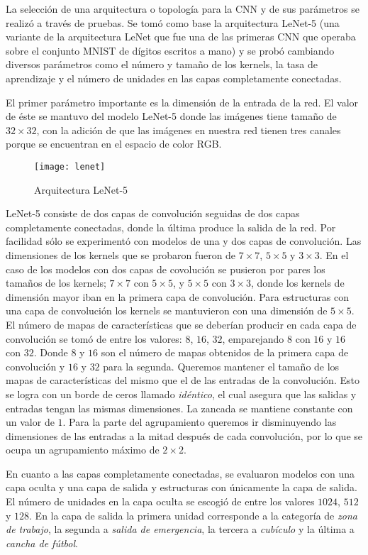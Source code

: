 La selección de una arquitectura o topología para la CNN y de sus parámetros se
realizó a través de pruebas. Se tomó como base 
la arquitectura LeNet-5 (una variante de la arquitectura LeNet  que fue una de las primeras CNN que operaba sobre el 
conjunto MNIST de dígitos escritos a mano) y se probó cambiando
diversos parámetros como el número y tamaño de los kernels, la tasa de aprendizaje y el número de unidades en las capas completamente conectadas.

El primer parámetro importante es la dimensión de
la entrada de la red. El valor de éste se mantuvo del
modelo LeNet-5 donde las imágenes tiene tamaño de $32 \times 32$,
con la adición de que las imágenes en nuestra red
tienen tres canales porque se encuentran en el espacio de 
color RGB.

\begin{figure}[!ht]
\centering
\caption{Arquitectura LeNet-5}
\texttt{[image: lenet]}
\end{figure}

LeNet-5 consiste de dos capas de convolución seguidas de dos
capas completamente conectadas, donde la última produce
la salida de la red.
Por facilidad sólo se experimentó con modelos de una y dos capas
de convolución. Las dimensiones de los kernels  que se probaron fueron de 
$7 \times 7$,
$5 \times 5$ y $3 \times 3$. En el caso de los modelos con
dos capas de covolución se pusieron por pares los tamaños de
los kernels; $7 \times 7$ con
$5 \times 5$, y $5 \times 5$ con $3 \times 3$, donde los kernels
de dimensión mayor iban en la primera capa de convolución.
Para estructuras con una capa de convolución los kernels
se mantuvieron con una dimensión de $5 \times 5$.
El número de mapas de características que se deberían producir
en cada capa de convolución se tomó de entre los valores: $8$, 
$16$, $32$, emparejando $8$ con $16$ y $16$ con $32$.
Donde $8$ y $16$ son el número de mapas obtenidos de la primera 
capa de convolución y $16$ y $32$ para la segunda.
Queremos mantener el tamaño de los mapas de
características del mismo que el de las entradas de la convolución.
Esto se logra con un borde de ceros llamado \textit{idéntico}, 
el cual asegura que las salidas y entradas tengan las mismas dimensiones. 
La zancada se mantiene constante con un valor de $1$.
Para la parte del agrupamiento queremos ir disminuyendo las 
dimensiones de las entradas a la mitad después de cada
convolución, por lo que se ocupa un agrupamiento máximo 
de $2 \times 2$.


En cuanto a las capas completamente conectadas, se evaluaron
modelos con una capa oculta y una capa de salida y estructuras
con únicamente la capa de salida. El número de unidades 
en la capa oculta se escogió de entre los valores $1024$,
$512$ y $128$. En la capa de salida la primera unidad corresponde a la
categoría de \textit{zona de trabajo}, la segunda a 
\textit{salida de emergencia}, la tercera a \textit{cubículo}
y la última a \textit{cancha de fútbol}.

